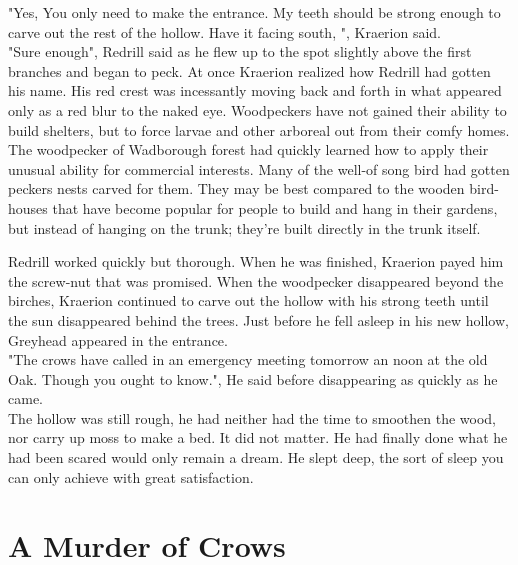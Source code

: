 \documentclass[smalldemyvopaper,11pt,twoside,onecolumn,openright,extrafontsizes]{memoir}
\begin{document}
"Yes, You only need to make the entrance. My teeth should be strong enough to carve out the rest of the hollow. Have it facing south, ", Kraerion said.\\

"Sure enough", Redrill said as he flew up to the spot slightly above the first branches and began to peck. At once Kraerion realized how Redrill had gotten his name. His red crest was incessantly moving back and forth in what appeared only as a red blur to the naked eye. Woodpeckers have not gained their ability to build shelters, but to force larvae and other arboreal out from their comfy homes. The woodpecker of Wadborough forest had quickly learned how to apply their unusual ability for commercial interests. Many of the well-of song bird had gotten peckers nests carved for them. They may be best compared to the wooden bird-houses that have become popular for people to build and hang in their gardens, but instead of hanging on the trunk; they're built directly in the trunk itself.

Redrill worked quickly but thorough. When he was finished, Kraerion payed him the screw-nut that was promised. When the woodpecker disappeared beyond the birches, Kraerion continued to carve out the hollow with his strong teeth until the sun disappeared behind the trees. Just before he fell asleep in his new hollow, Greyhead appeared in the entrance. \\

"The crows have called in an emergency meeting tomorrow an noon at the old Oak. Though you ought to know.", He said before disappearing as quickly as he came.\\

The hollow was still rough, he had neither had the time to smoothen the wood, nor carry up moss to make a bed. It did not matter. He had finally done what he had been scared would only remain a dream. He slept deep, the sort of sleep you can only achieve with great satisfaction.  

\chapter{A Murder of Crows}

\end{document}

